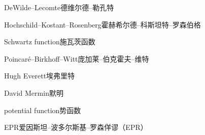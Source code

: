 \begin{multicols}{2}
DeWilde–Lecomte\hspace{0.9em}德维尔德–勒孔特\par
Hochschild–Kostant–Rosenberg\hspace{0.9em}霍赫希尔德–科斯坦特–罗森伯格\par
Schwartz function\hspace{0.9em}施瓦茨函数\par
Poincaré–Birkhoff–Witt\hspace{0.9em}庞加莱–伯克霍夫–维特\par
Hugh Everett\hspace{0.9em}埃弗里特\par
David Mermin\hspace{0.9em}默明\par
potential function\hspace{0.9em}势函数\par
EPR\hspace{0.9em}爱因斯坦–波多尔斯基–罗森佯谬（EPR）\par
\end{multicols}

\endgroup

